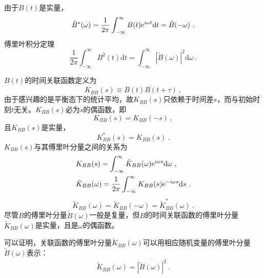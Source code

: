 \documentclass[11pt,a4paper]{article}
\newcommand{\dif}{\mathrm{d}}
\begin{document}
由于$B(t) $是实量，
\begin{equation}
\tilde{B}^\ast(\omega) = \dfrac{1}{2\pi} \int_{-\infty}^\infty B(t) {\rm e}^{i\omega t} \dif t = \tilde{B}(-\omega) ~.
\end{equation}
傅里叶积分定理
\begin{equation}
\dfrac{1}{2\pi} \int_{-\infty}^\infty B^2(t) \dif t = \int_{-\infty}^\infty |\tilde{B}(\omega)|^2 \dif \omega ~.
\end{equation}

$B(t)$的时间关联函数定义为
\begin{equation}
K_{BB}(s) \equiv \overline{B(t) B(t+\tau)} ~,
\end{equation}
由于感兴趣的是平衡态下的统计平均，故$K_{BB}(s)$只依赖于时间差$s$，而与初始时刻$t$无关。$K_{BB}(s)$必为$s$的偶函数，即
\begin{equation}
K_{BB}(s) = K_{BB}(-s) ~,
\end{equation}
且$K_{BB}(s)$是实量，
\begin{equation}
K_{BB}^\ast(s) = K_{BB}(s) ~.
\end{equation}
$K_{BB}(s)$与其傅里叶分量之间的关系为
\begin{align}
& K_{BB}(s) = \int_{-\infty}^\infty \tilde{K}_{BB}(\omega) {\rm e}^{i\omega s} \dif \omega ~, \\
& \tilde{K}_{BB}(\omega) = \dfrac{1}{2\pi} \int_{-\infty}^\infty  K_{BB}(s)  {\rm e}^{-i\omega s} \dif s ~.
\end{align}
\begin{equation}
\tilde{K}_{BB}(\omega) = \tilde{K}_{BB}(-\omega) = \tilde{K}_{BB}^\ast(\omega) ~.
\end{equation}
尽管$B$的傅里叶分量$\tilde{B}(\omega)$一般是复量，但$B$的时间关联函数的傅里叶分量$\tilde{K}_{BB}(\omega)$是实量，且是$\omega$的偶函数。

可以证明，关联函数的傅里叶分量$\tilde{K}_{BB}(\omega)$可以用相应随机变量的傅里叶分量$\tilde{B}(\omega)$表示：
\begin{equation}
\tilde{K}_{BB}(\omega) = \overline{|\tilde{B}(\omega)|^2} ~.
\end{equation}
\end{document}
